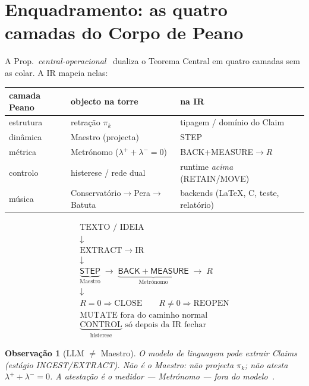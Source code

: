 \documentclass[11pt,a4paper]{article}
\newtheorem{observacao}[teorema]{Observação}
\begin{document}
\section{Enquadramento: as quatro camadas do Corpo de Peano}\label{sec:peano}

A Prop.~\emph{central-operacional}~\cite{peano} dualiza o Teorema Central em
quatro camadas sem as colar. A IR mapeia nelas:

\begin{center}\small
\begin{tabular}{@{}lll@{}}
\toprule
camada Peano & objecto na torre & na IR \\
\midrule
estrutura & retração $\pi_k$ & tipagem / domínio do Claim \\
dinâmica & Maestro (projecta) & \textsf{STEP} \\
métrica & Metrónomo ($\lambda^{+}+\lambda^{-}=0$) & \textsf{BACK}+\textsf{MEASURE}$\to R$ \\
controlo & histerese / rede dual & runtime \emph{acima} (RETAIN/MOVE) \\
música & Conservatório$\to$Pera$\to$Batuta & backends (LaTeX, C, teste, relatório) \\
\bottomrule
\end{tabular}
\end{center}

\[
\boxed{
\begin{array}{c}
\text{TEXTO / IDEIA}\\
\downarrow\\
\mathrm{EXTRACT}\to\mathrm{IR}\\
\downarrow\\
\underbrace{\mathsf{STEP}}_{\text{Maestro}}
\;\to\;
\underbrace{\mathsf{BACK}+\mathsf{MEASURE}}_{\text{Metrónomo}}
\;\to\; R\\
\downarrow\\
R=0\Rightarrow\mathrm{CLOSE}\qquad
R\neq0\Rightarrow\mathrm{REOPEN}\\[4pt]
\text{MUTATE fora do caminho normal}\\[2pt]
\underbrace{\mathrm{CONTROL}}_{\text{histerese}}
\text{ só depois da IR fechar}
\end{array}
}
\]

\begin{observacao}[LLM $\neq$ Maestro]
O modelo de linguagem pode \emph{extrair} Claims (estágio INGEST/EXTRACT). Não
é o Maestro: não projecta $\pi_k$; não atesta $\lambda^{+}+\lambda^{-}=0$. A
atestação é o medidor --- Metrónomo --- fora do modelo~\cite{peano,fundamento}.
\end{observacao}
\end{document}
